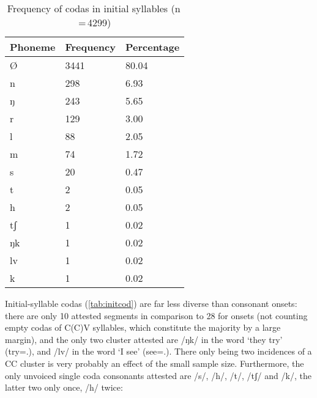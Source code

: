 \begin{table}[pth]\centering
\caption[Frequency of codas in initial syllables]{Frequency of codas in initial syllables (n\,=\,4299)}
\begin{tabu} to 0.5\textwidth{X X[c] X[c]}
\tableheaderfont\toprule
Phoneme
	& Frequency
	& Percentage
	\\
	
\toprule

Ø
	& 3441
	& 80.04\pct
	\\

\midrule

n
	& 298
	& 6.93\pct
	\\

ŋ
	& 243
	& 5.65\pct
	\\

r
	& 129
	& 3.00\pct
	\\

l
	& 88
	& 2.05\pct
	\\

m
	& 74
	& 1.72\pct
	\\

s
	& 20
	& 0.47\pct
	\\

t
	& 2
	& 0.05\pct
	\\

h
	& 2
	& 0.05\pct
	\\
	
tʃ
	& 1
	& 0.02\pct
	\\

ŋk
	& 1
	& 0.02\pct
	\\

lv
	& 1
	& 0.02\pct
	\\

k
	& 1
	& 0.02\pct
	\\

\bottomrule
\end{tabu}
\label{tab:initcod}
\end{table}

Initial-syllable codas (\autoref{tab:initcod}) are far less diverse than 
consonant onsets: there are only 10 attested segments in comparison to 28 for 
onsets (not counting empty codas of C(C)V syllables, which constitute the 
majority by a large margin), and the only two cluster attested are /ŋk/ in the 
word  `they try' (try=\TplM{}.\Aarg{}), and /lv/ in the 
word  `I see' (see=\Fpl{}.\Aarg{}). There only being 
two incidences of a CC cluster is very probably an effect of the small 
sample size. Furthermore, the only unvoiced single coda consonants attested are 
/s/, /h/, /t/, /tʃ/ and /k/, the latter two only once, /h/ twice:

